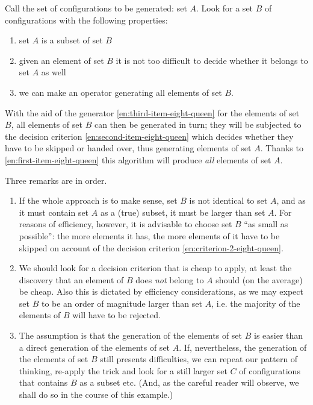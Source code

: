 Call the set of configurations to be generated: set $A$. Look for a set $B$ of configurations with the following properties:

\begin{enumerate}[leftmargin=2\parindent, label=(\arabic*)]
	\item \label{en:first-item-eight-queen}
	set $A$ is a subset of set $B$
	
	\item \label{en:second-item-eight-queen}
	given an element of set $B$ it is not too difficult to decide whether it belongs to set $A$ as well
	
	\item \label{en:third-item-eight-queen}
	we can make an operator generating all elements of set $B$. 
\end{enumerate}

With the aid of the generator \ref{en:third-item-eight-queen} for the elements of set $B$, all elements of set $B$ can then be generated in turn; they will be subjected to the decision criterion \ref{en:second-item-eight-queen} which decides whether they have to be skipped or handed over, thus generating elements of set $A$. Thanks to \ref{en:first-item-eight-queen} this algorithm will produce \textit{all} elements of set $A$.

Three remarks are in order.

\begin{enumerate}[leftmargin=2\parindent, label=(\arabic*)]
	\item If the whole approach is to make sense, set $B$ is not identical to set $A$, and as it must contain set $A$ as a (true) subset, it must be larger than set $A$. For reasons of efficiency, however, it is advisable to choose set $B$ ``as small as possible'': the more elements it has, the more elements of it have to be skipped on account of the decision criterion \ref{en:criterion-2-eight-queen}.
	
	\item \label{en:criterion-2-eight-queen}
	We should look for a decision criterion that is cheap to apply, at least the discovery that an element of $B$ does \textit{not} belong to $A$ should (on the average) be cheap. Also this is dictated by efficiency considerations, as we may expect set $B$ to be an order of magnitude larger than set $A$, i.e. the majority of the elements of $B$ will have to be rejected.
	
	\item The assumption is that the generation of the elements of set $B$ is easier than a direct generation of the elements of set $A$. If, nevertheless, the generation of the elements of set $B$ still presents difficulties, we can repeat our pattern of thinking, re-apply the trick and look for a still larger set $C$ of configurations that contains $B$ as a subset etc. (And, as the careful reader will observe, we shall do so in the course of this example.)
\end{enumerate}

